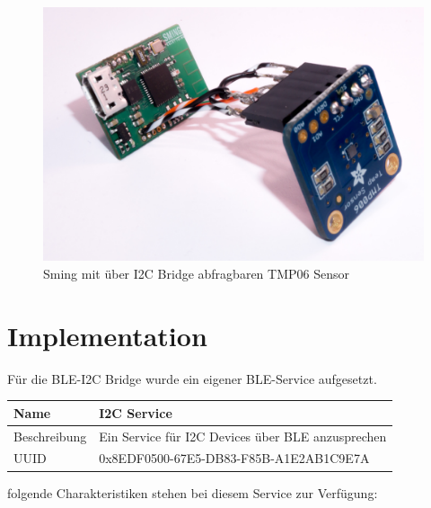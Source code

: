 \begin{figure}[hbtp]
    \center
    \includegraphics[width=\textwidth]{bilder/foto-2.jpg}
    \caption{Sming mit über I2C Bridge abfragbaren TMP06 Sensor}
    \label{fig:sming_mit_tmp06}
\end{figure}


\section{Implementation}
\label{bleI2cImplementation}

Für die BLE-I2C Bridge wurde ein eigener BLE-Service aufgesetzt.

\begin{tabularx}{\textwidth}{|l|X|}
\hline
Name & I2C Service                                       \\
\hline
Beschreibung & Ein Service für I2C Devices über BLE anzusprechen \\
\hline
UUID	&    0x8EDF0500-67E5-DB83-F85B-A1E2AB1C9E7A  \\
\hline                                            
\end{tabularx}

folgende Charakteristiken stehen bei diesem Service zur Verfügung:

